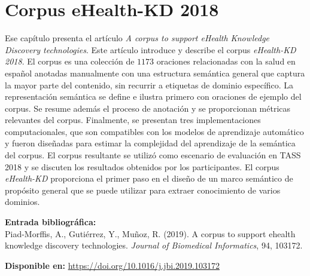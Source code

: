 
\chapter[Corpus eHealth-KD 20198 \textit{A corpus to support eHealth Knowledge Discovery technologies}]{Corpus eHealth-KD 2018}
\label{Chap:CorpusV1}

Ese capítulo presenta el artículo \textit{A corpus to support eHealth Knowledge Discovery technologies}.
Este artículo introduce y describe el corpus \textit{eHealth-KD 2018}. El corpus es una colección de $1173$ oraciones relacionadas con la salud en español anotadas manualmente con una estructura semántica general que captura la mayor parte del contenido, sin recurrir a etiquetas de dominio específico. La representación semántica se define e ilustra primero con oraciones de ejemplo del corpus. Se resume además el proceso de anotación y se proporcionan métricas relevantes del corpus. Finalmente, se presentan tres implementaciones computacionales, que son compatibles con los modelos de aprendizaje automático y fueron diseñadas para estimar la complejidad del aprendizaje de la semántica del corpus. El corpus resultante se utilizó como escenario de evaluación en TASS 2018 y se discuten los resultados obtenidos por los participantes. El corpus \textit{eHealth-KD} proporciona el primer paso en el diseño de un marco semántico de propósito general que se puede utilizar para extraer conocimiento de varios dominios.

\BlankLine
\noindent \textbf{Entrada bibliográfica:}\\
Piad-Morffis, A., Gutiérrez, Y., Muñoz, R. (2019). A corpus to support ehealth knowledge discovery technologies. \textit{Journal of Biomedical Informatics}, 94, 103172.

\BlankLine
\noindent \textbf{Disponible en:} \url{https://doi.org/10.1016/j.jbi.2019.103172}
